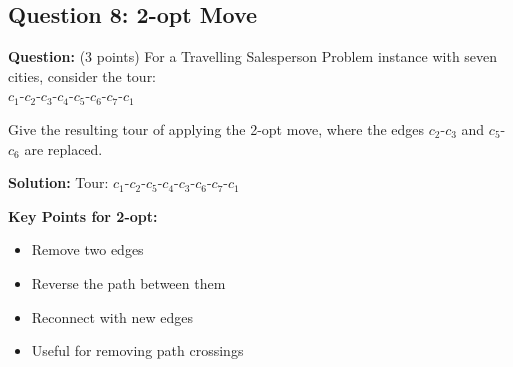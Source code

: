\subsection{Question 8: 2-opt Move}
\textbf{Question:} (3 points) For a Travelling Salesperson Problem instance with seven cities, consider the tour:\\
$c_1$-$c_2$-$c_3$-$c_4$-$c_5$-$c_6$-$c_7$-$c_1$

Give the resulting tour of applying the 2-opt move, where the edges $c_2$-$c_3$ and $c_5$-$c_6$ are replaced.

\textbf{Solution:} 
Tour: $c_1$-$c_2$-$c_5$-$c_4$-$c_3$-$c_6$-$c_7$-$c_1$

\textbf{Key Points for 2-opt:}
\begin{itemize}
\item Remove two edges
\item Reverse the path between them
\item Reconnect with new edges
\item Useful for removing path crossings
\end{itemize}

